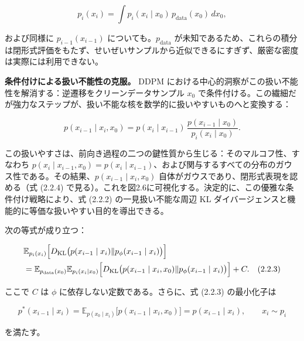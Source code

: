 \[
p_i(x_i) = \int p_i(x_i\mid x_0)\, p_{\mathrm{data}}(x_0)\, dx_0,
\]


および同様に $p_{i-1}(x_{i-1})$ についても。$p_{\mathrm{data}}$ が未知であるため、これらの積分は閉形式評価をもたず、せいぜいサンプルから近似できるにすぎず、厳密な密度は実際には利用できない。



\textbf{条件付けによる扱い不能性の克服。} DDPM における中心的洞察がこの扱い不能性を解消する：逆遷移をクリーンデータサンプル $x_0$ で条件付ける。この繊細だが強力なステップが、扱い不能な核を数学的に扱いやすいものへと変換する：

\[
p(x_{i-1}\mid x_i,x_0) = p(x_i\mid x_{i-1})\,\frac{p(x_{i-1}\mid x_0)}{p_i(x_i\mid x_0)}.
\]


この扱いやすさは、前向き過程の二つの鍵性質から生じる：そのマルコフ性、すなわち $p(x_i\mid x_{i-1},x_0)=p(x_i\mid x_{i-1})$、および関与するすべての分布のガウス性である。その結果、$p(x_{i-1}\mid x_i,x_0)$ 自体がガウスであり、閉形式表現を認める（式 (2.2.4) で見る）。これを図2.6に可視化する。決定的に、この優雅な条件付け戦略により、式 (2.2.2) の一見扱い不能な周辺 KL ダイバージェンスと機能的に等価な扱いやすい目的を導出できる。

\begin{propositionbox}
次の等式が成り立つ：

\[
\begin{aligned}
&\mathbb{E}_{p_i(x_i)}\Bigl[D_{\mathrm{KL}}\bigl(p(x_{i-1}\mid x_i)\Vert p_\phi(x_{i-1}\mid x_i)\bigr)\Bigr] \\
&= \mathbb{E}_{p_{\mathrm{data}}(x_0)}\mathbb{E}_{p_i(x_i\mid x_0)}\Bigl[D_{\mathrm{KL}}\bigl(p(x_{i-1}\mid x_i,x_0)\Vert p_\phi(x_{i-1}\mid x_i)\bigr)\Bigr] + C. \quad (2.2.3)
\end{aligned}
\]

ここで $C$ は $\phi$ に依存しない定数である。さらに、式 (2.2.3) の最小化子は

\[
p^*(x_{i-1}\mid x_i) = \mathbb{E}_{p(x_0\mid x_i)}\bigl[p(x_{i-1}\mid x_i,x_0)\bigr] = p(x_{i-1}\mid x_i), \qquad x_i\sim p_i
\]

を満たす。
\end{propositionbox}



